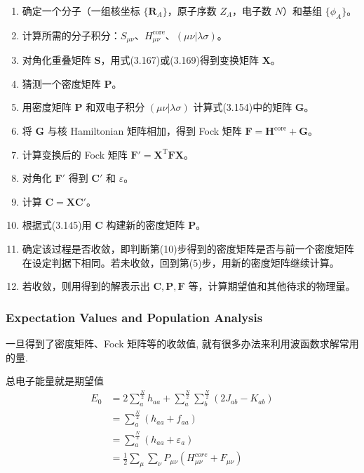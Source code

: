 \documentclass[fontset=none,12pt,a4paper]{ctexart}
\numberwithin{equation}{section}
\begin{document}
\begin{enumerate}
    \item 确定一个分子（一组核坐标 $\{\mathbf{R}_A\}$，原子序数 $Z_A$，电子数 $N$）和基组 $\{\phi_A\}$。
    \item 计算所需的分子积分：$S_{\mu\nu}$、$H_{\mu\nu}^\text{core}$、$(\mu\nu|\lambda\sigma)$。
    \item 对角化重叠矩阵 $\mathbf{S}$，用式(3.167)或(3.169)得到变换矩阵 $\mathbf{X}$。
    \item 猜测一个密度矩阵 $\mathbf{P}$。
    \item 用密度矩阵 $\mathbf{P}$ 和双电子积分 $(\mu\nu|\lambda\sigma)$ 计算式(3.154)中的矩阵 $\mathbf{G}$。
    \item 将 $\mathbf{G}$ 与核 Hamiltonian 矩阵相加，得到 Fock 矩阵 $\mathbf{F} = \mathbf{H}^\text{core} + \mathbf{G}$。
    \item 计算变换后的 Fock 矩阵 $\mathbf{F}' = \mathbf{X}^\mathrm{T} \mathbf{F} \mathbf{X}$。
    \item 对角化 $\mathbf{F}'$ 得到 $\mathbf{C}'$ 和 $\varepsilon$。
    \item 计算 $\mathbf{C} = \mathbf{X} \mathbf{C}'$。
    \item 根据式(3.145)用 $\mathbf{C}$ 构建新的密度矩阵 $\mathbf{P}$。
    \item 确定该过程是否收敛，即判断第(10)步得到的密度矩阵是否与前一个密度矩阵在设定判据下相同。若未收敛，回到第(5)步，用新的密度矩阵继续计算。
    \item 若收敛，则用得到的解表示出 $\mathbf{C}, \mathbf{P}, \mathbf{F}$ 等，计算期望值和其他待求的物理量。
\end{enumerate}
\subsubsection{Expectation Values and Population Analysis}
一旦得到了密度矩阵、Fock 矩阵等的收敛值, 就有很多办法来利用波函数求解常用的量.

总电子能量就是期望值
\begin{equation}
  \begin{aligned}
  E_0&=2\sum_{a}^{\frac{N}{2}}h_{aa}+\sum_{a}^{\frac{N}{2}}\sum_{b}^{\frac{N}{2}}(2J_{ab}-K_{ab}) \\
  &=\sum_a^{\frac{N}{2}}(h_{aa}+f_{aa}) \\
  &=\sum_a^{\frac{N}{2}}(h_{aa}+\varepsilon_a) \\
  &=\frac{1}{2}\sum_{\mu}\sum_{\nu}P_{\mu\nu}(H_{\mu\nu}^{core}+F_{\mu\nu})
  \end{aligned}
\end{equation}
\end{document}
